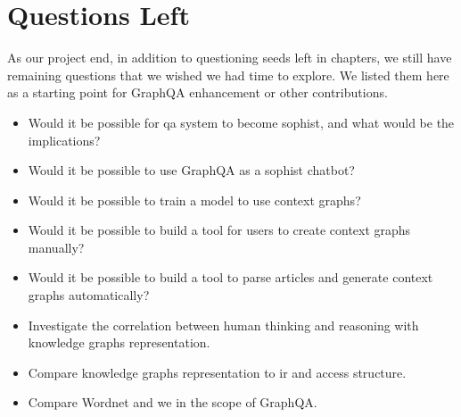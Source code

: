 \section{Questions Left}
As our project end, in addition to questioning seeds left in chapters, we still have remaining questions that we wished we had time to explore. We listed them here as a starting point for GraphQA enhancement or other contributions.

\begin{itemize}
    \setlength\itemsep{0em}
    \item Would it be possible for \gls{qa} system to become sophist, and what would be the implications?
    \item Would it be possible to use GraphQA as a sophist chatbot?
    \item Would it be possible to train a model to use context graphs?
    \item Would it be possible to build a tool for users to create context graphs manually?
    \item Would it be possible to build a tool to parse articles and generate context graphs automatically? 
    \item Investigate the correlation between human thinking and reasoning with knowledge graphs representation.
    \item Compare knowledge graphs representation to \gls{ir} and access structure.
    \item Compare Wordnet and \gls{we} in the scope of GraphQA.
\end{itemize}













